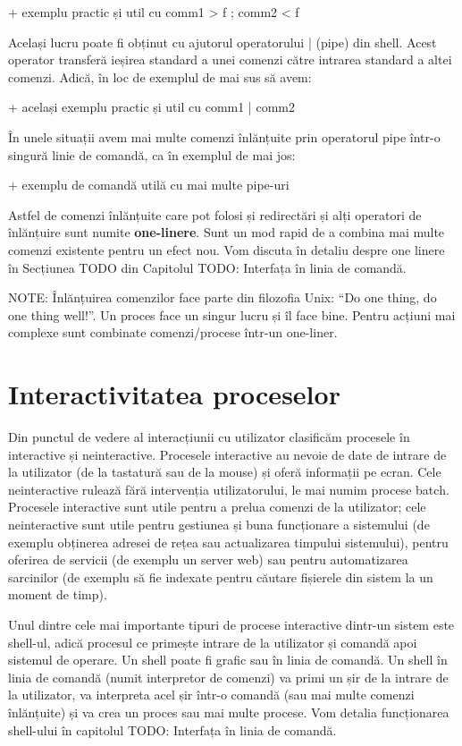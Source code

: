 +     exemplu practic și util cu comm1 > f ; comm2 < f

Același lucru poate fi obținut cu ajutorul operatorului | (pipe) din shell.
Acest operator transferă ieșirea standard a unei comenzi către intrarea standard
a altei comenzi. Adică, în loc de exemplul de mai sus să avem:

+     același exemplu practic și util cu comm1 | comm2

În unele situații avem mai multe comenzi înlănțuite prin operatorul pipe într-o
singură linie de comandă, ca în exemplul de mai jos:

+     exemplu de comandă utilă cu mai multe pipe-uri

Astfel de comenzi înlănțuite care pot folosi și redirectări și alți operatori de
înlănțuire sunt numite \textbf{one-linere}. Sunt un mod rapid de a combina mai multe
comenzi existente pentru un efect nou. Vom discuta în detaliu despre one linere
în Secțiunea TODO din Capitolul TODO: Interfața în linia de comandă.

NOTE: Înlănțuirea comenzilor face parte din filozofia Unix: “Do one thing, do
one thing well!”. Un proces face un singur lucru și îl face bine. Pentru acțiuni
mai complexe sunt combinate comenzi/procese într-un one-liner.

\section{Interactivitatea proceselor}

Din punctul de vedere al interacțiunii cu utilizator clasificăm procesele în
interactive și neinteractive. Procesele interactive au nevoie de date de intrare
de la utilizator (de la tastatură sau de la mouse) și oferă informații pe ecran.
Cele neinteractive rulează fără intervenția utilizatorului, le mai numim procese
batch. Procesele interactive sunt utile pentru a prelua comenzi de la
utilizator; cele neinteractive sunt utile pentru gestiunea și buna funcționare a
sistemului (de exemplu obținerea adresei de rețea sau actualizarea timpului
sistemului), pentru oferirea de servicii (de exemplu un server web) sau pentru
automatizarea sarcinilor (de exemplu să fie indexate pentru căutare fișierele
din sistem la un moment de timp).

Unul dintre cele mai importante tipuri de procese interactive dintr-un sistem
este shell-ul, adică procesul ce primește intrare de la utilizator și comandă
apoi sistemul de operare. Un shell poate fi grafic sau în linia de comandă. Un
shell în linia de comandă (numit interpretor de comenzi) va primi un șir de la
intrare de la utilizator, va interpreta acel șir într-o comandă (sau mai multe
comenzi înlănțuite) și va crea un proces sau mai multe procese. Vom detalia
funcționarea shell-ului în capitolul TODO: Interfața în linia de comandă.

